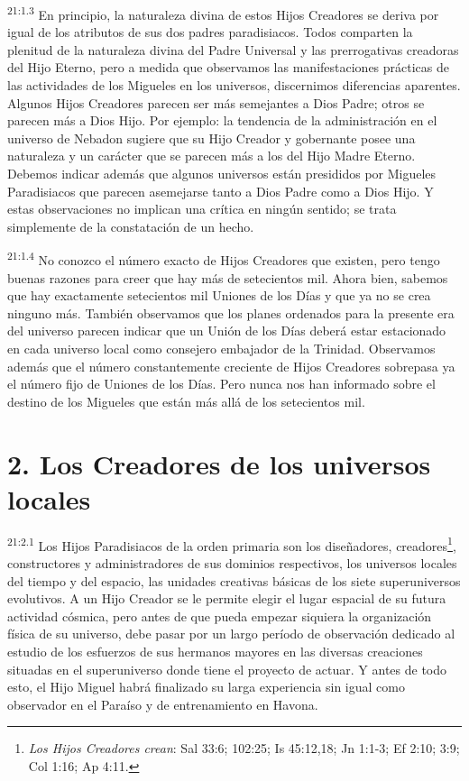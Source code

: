 \par
\textsuperscript{21:1.3} En principio, la naturaleza divina de estos Hijos Creadores se deriva por igual de los atributos de sus dos padres paradisiacos. Todos comparten la plenitud de la naturaleza divina del Padre Universal y las prerrogativas creadoras del Hijo Eterno, pero a medida que observamos las manifestaciones prácticas de las actividades de los Migueles en los universos, discernimos diferencias aparentes. Algunos Hijos Creadores parecen ser más semejantes a Dios Padre; otros se parecen más a Dios Hijo. Por ejemplo: la tendencia de la administración en el universo de Nebadon sugiere que su Hijo Creador y gobernante posee una naturaleza y un carácter que se parecen más a los del Hijo Madre Eterno. Debemos indicar además que algunos universos están presididos por Migueles Paradisiacos que parecen asemejarse tanto a Dios Padre como a Dios Hijo. Y estas observaciones no implican una crítica en ningún sentido; se trata simplemente de la constatación de un hecho.

\par
\textsuperscript{21:1.4} No conozco el número exacto de Hijos Creadores que existen, pero tengo buenas razones para creer que hay más de setecientos mil. Ahora bien, sabemos que hay exactamente setecientos mil Uniones de los Días y que ya no se crea ninguno más. También observamos que los planes ordenados para la presente era del universo parecen indicar que un Unión de los Días deberá estar estacionado en cada universo local como consejero embajador de la Trinidad. Observamos además que el número constantemente creciente de Hijos Creadores sobrepasa ya el número fijo de Uniones de los Días. Pero nunca nos han informado sobre el destino de los Migueles que están más allá de los setecientos mil.

\section*{2. Los Creadores de los universos locales}
\par
\textsuperscript{21:2.1} Los Hijos Paradisiacos de la orden primaria son los diseñadores, creadores\footnote{\textit{Los Hijos Creadores crean}: Sal 33:6; 102:25; Is 45:12,18; Jn 1:1-3; Ef 2:10; 3:9; Col 1:16; Ap 4:11.}, constructores y administradores de sus dominios respectivos, los universos locales del tiempo y del espacio, las unidades creativas básicas de los siete superuniversos evolutivos. A un Hijo Creador se le permite elegir el lugar espacial de su futura actividad cósmica, pero antes de que pueda empezar siquiera la organización física de su universo, debe pasar por un largo período de observación dedicado al estudio de los esfuerzos de sus hermanos mayores en las diversas creaciones situadas en el superuniverso donde tiene el proyecto de actuar. Y antes de todo esto, el Hijo Miguel habrá finalizado su larga experiencia sin igual como observador en el Paraíso y de entrenamiento en Havona.

